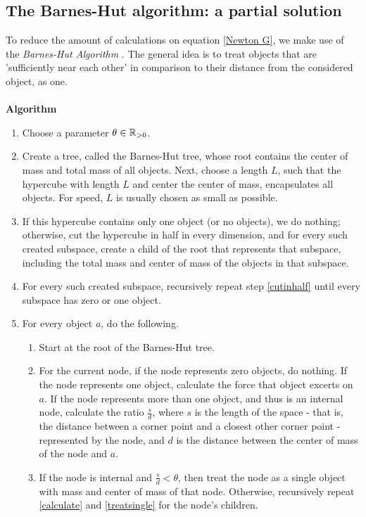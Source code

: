 \subsection{The Barnes-Hut algorithm: a partial solution}
To reduce the amount of calculations on equation \eqref{Newton G}, we make use of the \textit{Barnes-Hut Algorithm} \cite{barneshut}. The general idea is to treat objects that are 'sufficiently near each other' in comparison to their distance from the considered object, as one.\\
\\
\textbf{Algorithm}
\begin{enumerate}
\item Choose a parameter $\theta \in \mathbb{R}_{>0}$.
\item Create a tree, called the Barnes-Hut tree, whose root contains the center of mass and total mass of all objects. Next, choose a length $L$, such that the hypercube with length $L$ and center the center of mass, encapsulates all objects. For speed, $L$ is usually chosen as small as possible.
\item If this hypercube contains only one object (or no objects), we do nothing; otherwise, cut the hypercube in half in every dimension, and for every such created subspace, create a child of the root that represents that subspace, including the total mass and center of mass of the objects in that subspace.\label{cutinhalf}
\item For every such created subspace, recursively repeat step \ref{cutinhalf} until every subspace has zero or one object.
\item For every object $a$, do the following.
\begin{enumerate}
\item Start at the root of the Barnes-Hut tree.
\item For the current node, if the node represents zero objects, do nothing. If the node represents one object, calculate the force that object excerts on $a$. If the node represents more than one object, and thus is an internal node, calculate the ratio $\frac{s}{d}$, where $s$ is the length of the space - that is, the distance between a corner point and a closest other corner point - represented by the node, and $d$ is the distance between the center of mass of the node and $a$.\label{calculate}
\item If the node is internal and $\frac{s}{d}<\theta$, then treat the node as a single object with mass and center of mass of that node. Otherwise, recursively repeat \ref{calculate} and \ref{treatsingle} for the node's children.\label{treatsingle}
\end{enumerate}
\end{enumerate}
